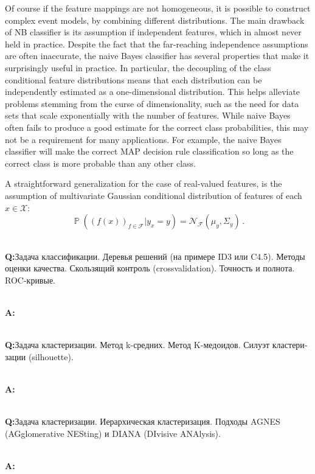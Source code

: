 \documentclass[a4paper]{article}
\newcommand{\Fcal}{\mathcal{F}}
\newcommand{\Ncal}{\mathcal{N}}
\newcommand{\Xcal}{\mathcal{X}}
\newcommand{\pr}{\mathop{\mathbb{P}}\nolimits}
\newcommand{\rus}[1]{\foreignlanguage{russian}{#1}}
\begin{document}

Of course if the feature mappings are not homogeneous, it is possible to construct
complex event models, by combining different distributions. The main drawback of
NB classifier is its assumption if independent features, which in almost never held
in practice. Despite the fact that the far-reaching independence assumptions are
often inaccurate, the naive Bayes classifier has several properties that make it
surprisingly useful in practice. In particular, the decoupling of the class conditional
feature distributions means that each distribution can be independently estimated
as a one-dimensional distribution. This helps alleviate problems stemming from the
curse of dimensionality, such as the need for data sets that scale exponentially
with the number of features. While naive Bayes often fails to produce a good estimate
for the correct class probabilities, this may not be a requirement for many applications.
For example, the naive Bayes classifier will make the correct MAP decision rule
classification so long as the correct class is more probable than any other class.

A straightforward generalization for the case of real-valued features, is the assumption
of multivariate Gaussian conditional distribution of features of each $x\in \Xcal$:
$$ \pr((f(x))_{f\in \Fcal}| y_x=y) = \Ncal_\Fcal(\mu_y, \Sigma_y) \,. $$

\hfill\\\textbf{Q:}\rus{Задача классификации. Деревья решений (на примере ID3 или
C4.5). Методы оценки качества. Скользящий контроль (crossvalidation). Точность и
полнота. ROC-кривые.}

\hfill\\\textbf{A:}

\hfill\\\textbf{Q:}\rus{Задача кластеризации. Метод k-средних. Метод K-медоидов.
Силуэт кластеризации (silhouette).}

\hfill\\\textbf{A:}

\hfill\\\textbf{Q:}\rus{Задача кластеризации. Иерархическая кластеризация. Подходы
AGNES (AGglomerative NESting) и DIANA (DIvisive ANAlysis).}

\hfill\\\textbf{A:}
\end{document}
